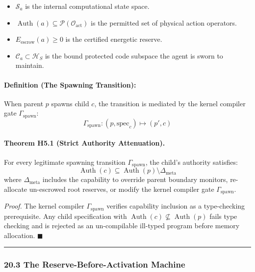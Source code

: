 \documentclass[
]{article}
\providecommand{\tightlist}{%
  \setlength{\itemsep}{0pt}\setlength{\parskip}{0pt}}
\begin{document}
\begin{itemize}
\tightlist
\item
  \(\mathcal{S}_a\) is the internal computational state space.
\item
  \(\operatorname{Auth}(a) \subseteq \mathcal{P}(\mathcal{O}_{\mathrm{act}})\)
  is the permitted set of physical action operators.
\item
  \(E_{\mathrm{escrow}}(a) \ge 0\) is the certified energetic reserve.
\item
  \(\mathcal{C}_a \subset \mathcal{H}_S\) is the bound protected code
  subspace the agent is sworn to maintain.
\end{itemize}

\paragraph{Definition (The Spawning
Transition):}\label{definition-the-spawning-transition}

When parent \(p\) spawns child \(c\), the transition is mediated by the
kernel compiler gate \(\Gamma_{\mathrm{spawn}}\):
\[\Gamma_{\mathrm{spawn}} : (p, \text{spec}_c) \mapsto (p', c)\]

\paragraph{Theorem H5.1 (Strict Authority
Attenuation).}\label{theorem-h5.1-strict-authority-attenuation.}

For every legitimate spawning transition \(\Gamma_{\mathrm{spawn}}\),
the child's authority satisfies:
\[\operatorname{Auth}(c) \subseteq \operatorname{Auth}(p) \setminus \Delta_{\mathrm{meta}}\]
where \(\Delta_{\mathrm{meta}}\) includes the capability to override
parent boundary monitors, re-allocate un-escrowed root reserves, or
modify the kernel compiler gate \(\Gamma_{\mathrm{spawn}}\).

\emph{Proof.} The kernel compiler \(\Gamma_{\mathrm{spawn}}\) verifies
capability inclusion as a type-checking prerequisite. Any child
specification with
\(\operatorname{Auth}(c) \not\subseteq \operatorname{Auth}(p)\) fails
type checking and is rejected as an un-compilable ill-typed program
before memory allocation. \(\blacksquare\)

\begin{center}\rule{0.5\linewidth}{0.5pt}\end{center}

\subsubsection{20.3 The Reserve-Before-Activation
Machine}\label{the-reserve-before-activation-machine}
\end{document}
